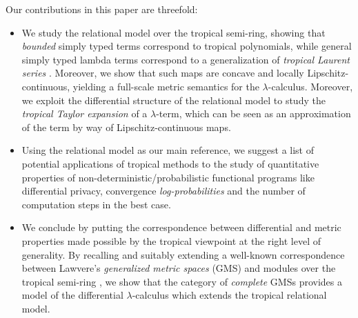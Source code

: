 Our contributions in this paper are threefold:
\begin{itemize}

\item We study the relational model over the tropical semi-ring, showing that
\emph{bounded} simply typed terms correspond to tropical polynomials, while general
 simply typed lambda terms correspond to a generalization of \emph{tropical Laurent series} \cite{}. Moreover, we show that such maps are concave and locally Lipschitz-continuous, yielding a full-scale metric semantics for the $\lambda$-calculus.
Moreover, we exploit the differential structure of the relational model to study the \emph{tropical Taylor expansion} of a $\lambda$-term, which can be seen as an approximation of the term by way of Lipschitz-continuous maps.


\item Using the relational model as our main reference, we suggest a list of potential applications of tropical methods to the study of quantitative properties of non-deterministic/probabilistic functional programs like differential privacy, convergence \emph{log-probabilities} and the number of computation steps in the best case.

\item We conclude by putting the correspondence between differential and metric properties made possible by the tropical viewpoint at the right level of generality. 
By recalling and suitably extending a well-known correspondence between Lawvere's \emph{generalized metric spaces} (GMS) \cite{} and modules over the tropical semi-ring \cite{}, we show that the category of \emph{complete}  GMSs provides a model of the differential $\lambda$-calculus which extends the tropical relational model.
\end{itemize}
%
%
%
%
%
%
%
%
%


